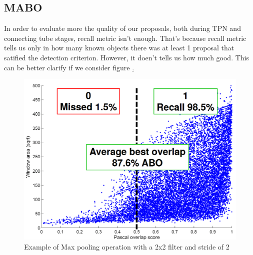 \documentclass{report}
\begin{document}
\subsection{MABO}

In order to evaluate more the quality of our proposals, both during TPN and connecting tube stages, recall metric isn't enough. That's because recall metric tells us only in how many
known objects there was at least 1 proposal that satified the detection criterion. However, it doen't tells us how much good. This can be better clarify if we consider figure \href{fig:mabo_fig}.

\begin{figure}[h]
  \centering
  \includegraphics[scale=0.25]{mabo}
  \caption{Example of Max pooling operation with a 2x2 filter  and stride of 2}
  \label{fig:mabo_fig}
\end{figure}
\end{document}
